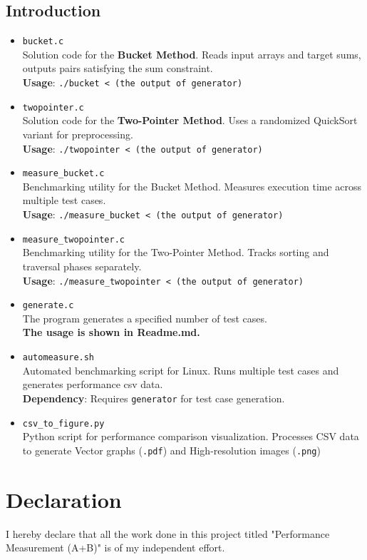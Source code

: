 \documentclass{report}
\begin{document}
\section*{Introduction}
\begin{itemize}
    \item \texttt{bucket.c} \\
    Solution code for the \textbf{Bucket Method}. Reads input arrays and target sums, outputs pairs satisfying the sum constraint. \\
    \textbf{Usage}: \texttt{./bucket < (the output of generator)}
    
    \item \texttt{twopointer.c} \\
    Solution code for the \textbf{Two-Pointer Method}. Uses a randomized QuickSort variant for preprocessing. \\
    \textbf{Usage}: \texttt{./twopointer < (the output of generator)}
    
    \item \texttt{measure\_bucket.c} \\
    Benchmarking utility for the Bucket Method. Measures execution time across multiple test cases. \\
    \textbf{Usage}: \texttt{./measure\_bucket < (the output of generator)}
    
    \item \texttt{measure\_twopointer.c} \\
    Benchmarking utility for the Two-Pointer Method. Tracks sorting and traversal phases separately. \\
    \textbf{Usage}: \texttt{./measure\_twopointer < (the output of generator)}
    
    \item \texttt{generate.c} \\
    The program generates a specified number of test cases. \\
    \textbf{The usage is shown in Readme.md.}

    \item \texttt{automeasure.sh} \\
    Automated benchmarking script for Linux. Runs multiple test cases and generates performance csv data. \\
    \textbf{Dependency}: Requires \texttt{generator} for test case generation.
    
    \item \texttt{csv\_to\_figure.py} \\
    Python script for performance comparison visualization. Processes CSV data to generate Vector graphs (\texttt{.pdf})
    and High-resolution images (\texttt{.png})
\end{itemize}


\chapter*{Declaration}
I hereby declare that all the work done in this project titled "Performance Measurement (A+B)" is of my independent effort.
\end{document}

